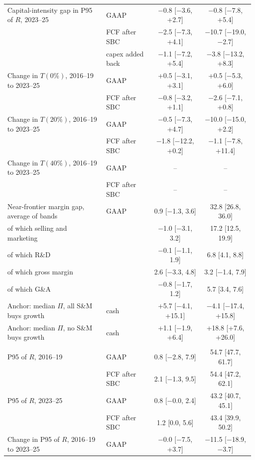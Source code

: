 \begin{table}[t]
\begin{tabular}{@{}>{\raggedright\arraybackslash}p{7.2cm}lcc@{}}
Capital-intensity gap in P95 of $R$, 2023--25 & GAAP & $-$0.8 [$-$3.6, +2.7] & $-$0.8 [$-$7.8, +5.4] \\
 & FCF after SBC & $-$2.5 [$-$7.3, +4.1] & $-$10.7 [$-$19.0, $-$2.7] \\
 & capex added back & $-$1.1 [$-$7.2, +5.4] & $-$3.8 [$-$13.2, +8.3] \\
Change in $T(0\%)$, 2016--19 to 2023--25 & GAAP & +0.5 [$-$3.1, +3.1] & +0.5 [$-$5.3, +6.0] \\
 & FCF after SBC & $-$0.8 [$-$3.2, +1.1] & $-$2.6 [$-$7.1, +0.8] \\
Change in $T(20\%)$, 2016--19 to 2023--25 & GAAP & $-$0.5 [$-$7.3, +4.7] & $-$10.0 [$-$15.0, +2.2] \\
 & FCF after SBC & $-$1.8 [$-$12.2, +0.2] & $-$1.1 [$-$7.8, +11.4] \\
Change in $T(40\%)$, 2016--19 to 2023--25 & GAAP & -- & -- \\
 & FCF after SBC & -- & -- \\
Near-frontier margin gap, average of bands & GAAP & 0.9 [$-$1.3, 3.6] & 32.8 [26.8, 36.0] \\
\quad of which selling and marketing &  & $-$1.0 [$-$3.1, 3.2] & 17.2 [12.5, 19.9] \\
\quad of which R\&D &  & $-$0.1 [$-$1.1, 1.9] & 6.8 [4.1, 8.8] \\
\quad of which gross margin &  & 2.6 [$-$3.3, 4.8] & 3.2 [$-$1.4, 7.9] \\
\quad of which G\&A &  & $-$0.8 [$-$1.7, 1.2] & 5.7 [3.4, 7.6] \\
Anchor: median $\Pi$, all S\&M buys growth & cash & +5.7 [$-$4.1, +15.1] & $-$4.1 [$-$17.4, +15.8] \\
Anchor: median $\Pi$, no S\&M buys growth & cash & +1.1 [$-$1.9, +6.4] & +18.8 [+7.6, +26.0] \\
\addlinespace\multicolumn{4}{l}{\emph{B. Distribution of reported scores (descriptive, E1 primary)}}\\
P95 of $R$, 2016--19 & GAAP & 0.8 [$-$2.8, 7.9] & 54.7 [47.7, 61.7] \\
 & FCF after SBC & 2.1 [$-$1.3, 9.5] & 54.4 [47.2, 62.1] \\
P95 of $R$, 2023--25 & GAAP & 0.8 [$-$0.0, 2.4] & 43.2 [40.7, 45.1] \\
 & FCF after SBC & 1.2 [0.0, 5.6] & 43.4 [39.9, 50.2] \\
Change in P95 of $R$, 2016--19 to 2023--25 & GAAP & $-$0.0 [$-$7.5, +3.7] & $-$11.5 [$-$18.9, $-$3.7] \\

\end{tabular}
\end{table}
